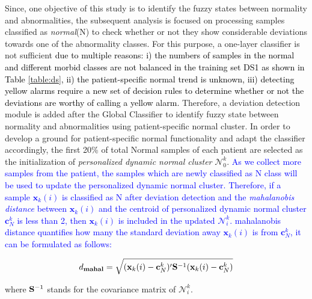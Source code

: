 Since, one objective of this study is to identify the fuzzy states between normality and abnormalities, the subsequent analysis is focused on processing samples classified as \textit{normal}(N) 
to check whether or not they show considerable deviations towards one of the abnormality classes. For this purpose, a one-layer classifier is not sufficient \textcolor{black}{due to multiple reasons: i) the numbers of samples in the normal and different morbid classes are not balanced in the training set DS1 as shown in Table \ref{table:ds}, ii) the patient-specific normal trend is unknown, iii) detecting yellow alarms require a new set of decision rules to determine whether or not the deviations are worthy of calling a yellow alarm.} Therefore, a deviation detection module is added after the Global Classifier to identify fuzzy state between normality and abnormalities %
using patient-specific normal cluster. In order to develop a ground for patient-specific normal functionality and adapt the classifier accordingly, the first 20\% of total Normal samples of each patient are selected as the initialization of \textit{personalized dynamic normal cluster} $\mathcal{N}_0^k$. \textcolor{blue}{As we collect more samples from the patient, the samples which are newly classified as N class will be used to update the personalized dynamic normal cluster. Therefore, if a sample $\mathbf{x}_k(i)$ is classified as N after deviation detection and the \textit{mahalanobis distance} between $\mathbf{x}_k(i)$ and the centroid of personalized dynamic normal cluster $\mathbf{c}^k_N$ is less than 2, then $\mathbf{x}_k(i)$ is included in the updated $\mathcal{N}_i^k$. mahalanobis distance quantifies how many the standard deviation away $\mathbf{x}_k(i)$ is from $\mathbf{c}^k_N$, it can be formulated as follows:}

\begin{align}
d_{\mathbf{mahal}} = \sqrt{ (\mathbf{x}_k(i)- \mathbf{c}^k_N)' {\rm \bf S}^{-1} (\mathbf{x}_k(i) - \mathbf{c}^k_N) }
\end{align}

where ${\rm \bf S}^{-1}$ stands for the covariance matrix of $\mathcal{N}_i^k$.


